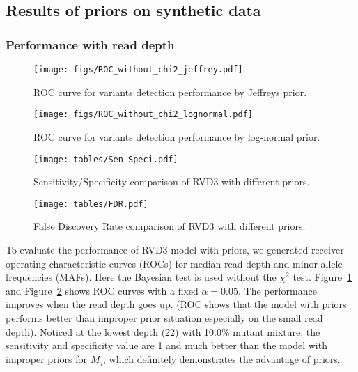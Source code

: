 \documentclass[11pt,reqno]{amsart}
\begin{document}
\subsection{Results of priors on synthetic data}
\subsubsection{Performance with read depth}

\begin{figure}[htbp]
\begin{center}
\texttt{[image: figs/ROC\_without\_chi2\_jeffrey.pdf]}
\caption{ROC curve for variants detection performance by Jeffreys prior.}
\label{fig:ROC_jeffrey}
\end{center}
\end{figure}

\begin{figure}[htbp]
\begin{center}
\texttt{[image: figs/ROC\_without\_chi2\_lognormal.pdf]}
\caption{ROC curve for variants detection performance by log-normal prior.}
\label{fig:ROC_lognormal}
\end{center}
\end{figure}


\begin{figure}[htbp]
\begin{center}
\texttt{[image: tables/Sen\_Speci.pdf]}
\caption{Sensitivity/Specificity comparison of RVD3 with different priors.}
\label{tbl:SS}
\end{center}
\end{figure}

\begin{figure}[htbp]
\begin{center}
\texttt{[image: tables/FDR.pdf]}
\caption{False Discovery Rate comparison of RVD3 with different priors.}
\label{tbl:FDR}
\end{center}
\end{figure}

To evaluate the performance of RVD3 model with priors, we generated receiver-operating characteristic curves (ROCs) for median read depth and minor allele frequencies (MAFs). Here the Bayesian test is used without the $\chi^2$ test. Figure~\ref{fig:ROC_jeffrey} and Figure~\ref{fig:ROC_lognormal} shows ROC curves with a fixed $\alpha=0.05$. The performance improves when the read depth goes up. (ROC shows that the model with priors performs better than improper prior situation especially on the small read depth). Noticed at the lowest depth (22) with 10.0\% mutant mixture, the sensitivity and specificity value are 1 and much better than the model with improper priors for $M_j$, which definitely demonstrates the advantage of priors.
\end{document}
